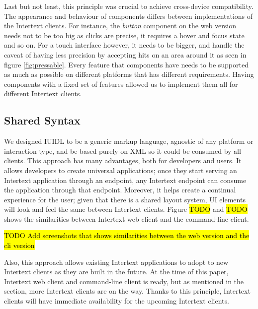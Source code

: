 Last but not least, this principle was crucial to achieve cross-device compatibility. The appearance and behaviour of components differs between implementations of the Intertext clients. For instance, the \textit{button} component on the web version needs not to be too big as clicks are precise, it requires a hover and focus state and so on. For a touch interface however, it needs to be bigger, and handle the caveat of having less precision by accepting hits on an area around it as seen in figure \ref{fig:pressable}. Every feature that components have needs to be supported as much as possible on different platforms that has different requirements. Having components with a fixed set of features allowed us to implement them all for different Intertext clients.

\subsection{Shared Syntax}

We designed IUIDL to be a generic markup language, agnostic of any platform or interaction type, and be based purely on XML so it could be consumed by all clients. This approach has many advantages, both for developers and users. It allows developers to create universal applications; once they start serving an Intertext application through an endpoint, any Intertext endpoint can consume the application through that endpoint. Moreover, it helps create a continual experience for the user; given that there is a shared layout system, UI elements will look and feel the same between Intertext clients. Figure \hl{TODO} and \hl{TODO} shows the similarities between Intertext web client and the command-line client.

\hl{TODO Add screenshots that shows similarities between the web version and the cli version}

Also, this approach allows existing Intertext applications to adopt to new Intertext clients as they are built in the future. At the time of this paper, Intertext web client and command-line client is ready, but as mentioned in the  section, more Intertext clients are on the way. Thanks to this principle, Intertext clients will have immediate availability for the upcoming Intertext clients.
